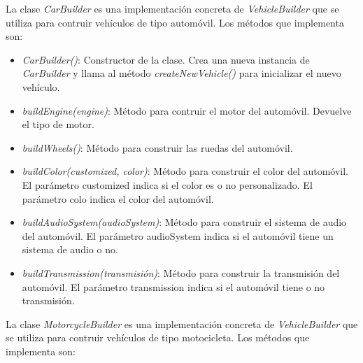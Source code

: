 \documentclass{article} %
\begin{document}
    \hspace*{1cm}La clase \textit{CarBuilder} es una implementación concreta de \textit{VehicleBuilder} que se utiliza para contruir vehículos
    de tipo automóvil. Los métodos que implementa son:

    \begin{itemize}
        \item \textit{CarBuilder()}: Constructor de la clase. Crea una nueva instancia de \textit{CarBuilder} y llama al método 
                \textit{createNewVehicle()} para inicializar el nuevo vehículo.
        \item \textit{buildEngine(engine)}: Método para contruir el motor del automóvil. Devuelve el tipo de motor.
        \item \textit{buildWheels()}: Método para construir las ruedas del automóvil.
        \item \textit{buildColor(customized, color)}: Método para construir el color del automóvil.
                El parámetro customized indica si el color es o no personalizado.
                El parámetro colo indica el color del automóvil.
        \item \textit{buildAudioSystem(audioSystem)}: Método para construir el sistema de audio del automóvil. 
                El parámetro audioSystem indica si el automóvil tiene un sistema de audio o no.
        \item \textit{buildTransmission(transmisión)}: Método para construir la transmisión del automóvil. 
                El parámetro transmission indica si el automóvil tiene o no transmisión.
    \end{itemize}

    \hspace*{1cm}La clase \textit{MotorcycleBuilder} es una implementación concreta de \textit{VehicleBuilder} que se utiliza para contruir vehículos
    de tipo motocicleta. Los métodos que implementa son:
\end{document}
